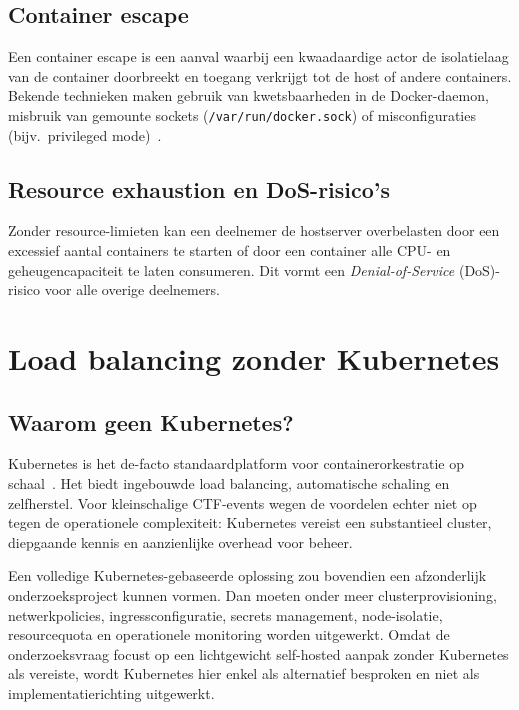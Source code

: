 \subsection{Container escape}

Een container escape is een aanval waarbij een kwaadaardige actor de isolatielaag van de container doorbreekt en toegang verkrijgt tot de host of andere containers. Bekende technieken maken gebruik van kwetsbaarheden in de Docker-daemon, misbruik van gemounte sockets (\texttt{/var/run/docker.sock}) of misconfiguraties (bijv.\ privileged mode)~\autocite{OWASP2024}.

\subsection{Resource exhaustion en DoS-risico's}

Zonder resource-limieten kan een deelnemer de hostserver overbelasten door een excessief aantal containers te starten of door een container alle CPU- en geheugencapaciteit te laten consumeren. Dit vormt een \textit{Denial-of-Service} (DoS)-risico voor alle overige deelnemers.

\section{Load balancing zonder Kubernetes}%
\label{sec:loadbalancing}

\subsection{Waarom geen Kubernetes?}

Kubernetes is het de-facto standaardplatform voor containerorkestratie op schaal~\autocite{kCTF,KubernetesOverview}. Het biedt ingebouwde load balancing, automatische schaling en zelfherstel. Voor kleinschalige CTF-events wegen de voordelen echter niet op tegen de operationele complexiteit: Kubernetes vereist een substantieel cluster, diepgaande kennis en aanzienlijke overhead voor beheer.

Een volledige Kubernetes-gebaseerde oplossing zou bovendien een afzonderlijk onderzoeksproject kunnen vormen. Dan moeten onder meer clusterprovisioning, netwerkpolicies, ingressconfiguratie, secrets management, node-isolatie, resourcequota en operationele monitoring worden uitgewerkt. Omdat de onderzoeksvraag focust op een lichtgewicht self-hosted aanpak zonder Kubernetes als vereiste, wordt Kubernetes hier enkel als alternatief besproken en niet als implementatierichting uitgewerkt.

